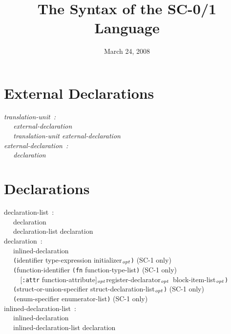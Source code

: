 \documentclass[a4]{article}
\title{The Syntax of the SC-0/1 Language}
\date{March 24, 2008}
\def\|{\verb|} %|
\newcommand{\opt}{$_{{\it opt}}$}
\newcommand{\scoo}{{\rm \hfill (SC-1 only)}}
\begin{document}
\maketitle
\small
\section{External Declarations}
\it \noindent
translation-unit{\rm \ :}\\
\|  | external-declaration \\
\|  | translation-unit external-declaration \\


\noindent
external-declaration{\rm \ :} \\
\|  | declaration \\
\rm 
\section{Declarations}
\it 

\noindent
declaration-list{\rm \ :} \\
\|  | declaration \\
\|  | declaration-list declaration \\ 

\noindent
declaration{\rm \ :} \\
\|  | inlined-declaration \\
\|  | {\tt (}identifier type-expression initializer\opt{\tt )} \scoo \\
\|  | {\tt (}function-identifier {\tt (fn} function-type-list{\tt )} \scoo\\
\|    | {\rm [}{\tt :attr} function-attribute{\rm ]}\opt register-declarator\opt\ block-item-list\opt{\tt )} \\ 
\|  | {\tt (}struct-or-union-specifier struct-declaration-list\opt{\tt )} \scoo \\
\|  | {\tt (}enum-specifier enumerator-list{\tt )} \scoo \\

\noindent
inlined-declaration-list{\rm \ :} \\
\|  | inlined-declaration \\
\|  | inlined-declaration-list declaration \\ 
\end{document}
